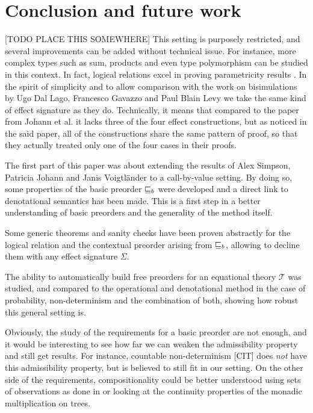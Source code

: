 \section{Conclusion and future work}




[TODO PLACE THIS SOMEWHERE] This setting is purposely restricted, and several improvements can 
be added without technical issue. For instance, more complex types 
such as sum, products and even type polymorphism can be studied 
in this context. In fact, logical relations excel in proving parametricity 
results \cite{wadler1989theorems}.
In the spirit of simplicity 
and to allow comparison with the work on bisimulations by
Ugo Dal Lago, Francesco Gavazzo and Paul Blain Levy
\cite{Ugo2017} we take the same kind of effect signature 
as they do. Technically, it means that compared to 
the paper from Johann et al. \cite{gom} it lacks 
three of the four effect constructions, but as noticed 
in the said paper, all of the constructions share the
same pattern of proof, so that they actually treated 
only one of the four cases in their proofs.

The first part of this paper was about extending the results 
of Alex Simpson, Patricia Johann and Janis Voigtländer \cite{gom}
to a call-by-value setting. By doing so, some properties of 
the basic preorder $\sqsubseteq_b$ were developed and a direct link
to denotational semantics has been made. This is a first step 
in a better understanding of basic preorders and the generality 
of the method itself. 

Some generic theorems and sanity checks have been proven 
abstractly for the logical relation and the contextual preorder
arising from $\sqsubseteq_b$, allowing to decline them with any 
effect signature $\Sigma$. 

The ability to automatically build free preorders for an equational 
theory $\mathcal{T}$ was studied, and compared to the operational 
and denotational method in the case of probability, non-determinism
and the combination of both, showing how robust this general setting 
is.

\vspace{1em}

Obviously, the study of the requirements for a basic preorder 
are not enough, and it would be interesting to see how far we 
can weaken the admissibility property and still get results.
For instance, countable non-determinism [CIT] does \emph{not} have 
this admissibility property, but is believed to still fit in 
our setting. On the other side of the requirements, compositionality 
could be better understood using sets of observations as done in 
\cite{gom} or looking at the continuity properties of the 
monadic multiplication on trees.

